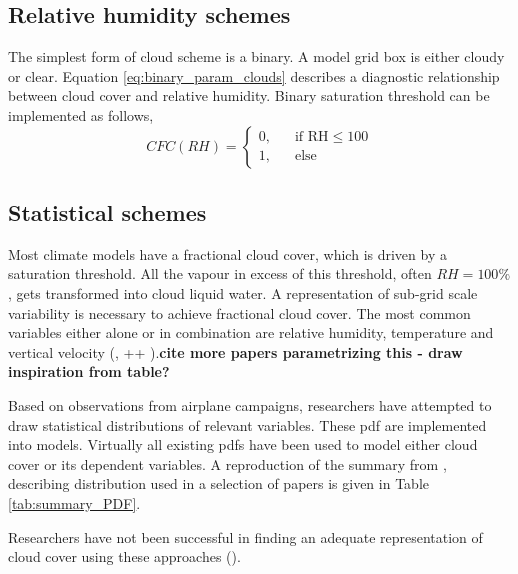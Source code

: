 \subsection{Relative humidity schemes}
The simplest form of cloud scheme is a binary. A model grid box is either cloudy or clear. Equation \eqref{eq:binary_param_clouds} describes a diagnostic relationship between cloud cover and relative humidity. Binary saturation threshold can be implemented as follows,
\begin{equation} \label{eq:binary_param_clouds}
    CFC\left(RH\right) = 
     \begin{cases}
       \text{0,} &\quad\text{if RH}\le100\\
       \text{1,} &\quad\text{else}
     \end{cases}
\end{equation}

\subsection{Statistical schemes}
Most climate models have a fractional cloud cover, which is driven by a saturation threshold. All the vapour in excess of this threshold, often $RH=100\%$, gets transformed into cloud liquid water. A representation of sub-grid scale variability is necessary to achieve fractional cloud cover. The most common variables either alone or in combination are relative humidity, temperature and vertical velocity (\cite{Golaz2002_part1}, ++ ).\textbf{cite more papers parametrizing this - draw inspiration from table?}  

Based on observations from airplane campaigns, researchers have attempted to draw statistical distributions of relevant variables. These \acrfull{pdf} are implemented into models. Virtually all existing \acrshort{pdf}s have been used to model either cloud cover or its dependent variables. %
A reproduction of the summary from \cite{Tompkins2009CloudParametrization}, describing distribution used in a selection of papers is given in Table \ref{tab:summary_PDF}.

Researchers have not been successful in finding an adequate representation of cloud cover using these approaches (\cite{Tompkins2009CloudParametrization}). 

